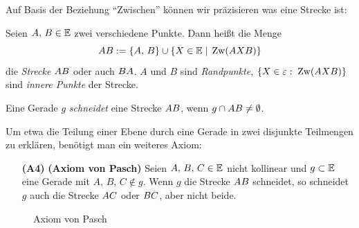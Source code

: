 
Auf Basis der Beziehung "`Zwischen"' können wir präzisieren was eine Strecke ist:

\begin{defi}[Strecke]
    Seien $A,\,B\in \mathbb E$ zwei verschiedene Punkte. Dann heißt die Menge
    $$
    {AB}:=\{A,\,B\}\cup\{X\in\mathbb E \; | \;\operatorname{Zw}(AXB)\}
    $$
    die {\em Strecke} ${AB}$ oder auch ${BA}$. $A$ und $B$ sind {\em Randpunkte}, $\{X \in
    \varepsilon:\; \operatorname{Zw}(AXB)\}$ sind {\em innere Punkte} der Strecke.
\end{defi}

Eine Gerade $g$ \emph{schneidet} eine Strecke ${AB}$, wenn $g\cap{AB}\neq \emptyset$.

Um etwa die Teilung einer Ebene durch eine Gerade in zwei disjunkte Teilmengen
zu erklären, benötigt man ein weiteres Axiom:


\begin{enumerate}
    \item[{\bf (A4)}] {\bf (Axiom von Pasch)} Seien $A,\,B,\,C\in\mathbb E$ nicht kollinear und
        $g\subset\mathbb E$ eine Gerade mit $A,\,B,\,C\notin g$. Wenn $g$ die Strecke ${AB}$ schneidet,
        so schneidet $g$ auch die Strecke ${AC}$ oder ${BC}$, aber nicht beide.
\end{enumerate}


\begin{figure}[ht]
    
    \caption{Axiom von Pasch}
\end{figure}


